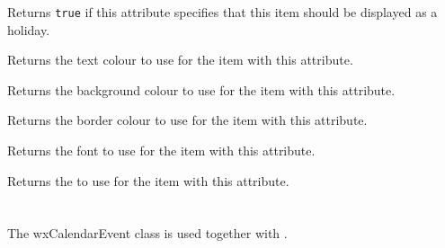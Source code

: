 \label{wxcalendardateattrisholiday}


Returns {\tt true} if this attribute specifies that this item should be
displayed as a holiday.


\label{wxcalendardateattrgettextcolour}


Returns the text colour to use for the item with this attribute.


\label{wxcalendardateattrgetbackgroundcolour}


Returns the background colour to use for the item with this attribute.


\label{wxcalendardateattrgetbordercolour}


Returns the border colour to use for the item with this attribute.


\label{wxcalendardateattrgetfont}


Returns the font to use for the item with this attribute.


\label{wxcalendardateattrgetborder}


Returns the  to use for the item with this attribute.



\section{}\label{wxcalendarevent}

The wxCalendarEvent class is used together with 
.


\\
\\
\\


